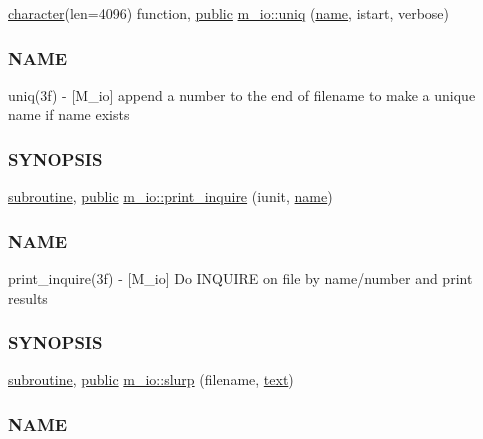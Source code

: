 \begin{DoxyCompactItemize}
\item 
\hyperlink{option__stopwatch_83_8txt_abd4b21fbbd175834027b5224bfe97e66}{character}(len=4096) function, \hyperlink{M__stopwatch_83_8txt_a2f74811300c361e53b430611a7d1769f}{public} \hyperlink{namespacem__io_a13a76a3cca012978c1d9c5c0c8b4a7ef}{m\+\_\+io\+::uniq} (\hyperlink{M__stopwatch_83_8txt_a3f508a893ae4c3b397b4383e33b9bcae}{name}, istart, verbose)
\begin{DoxyCompactList}\small\item\em \subsubsection*{N\+A\+ME}

uniq(3f) -\/ \mbox{[}M\+\_\+io\mbox{]} append a number to the end of filename to make a unique name if name exists \subsubsection*{S\+Y\+N\+O\+P\+S\+IS}\end{DoxyCompactList}\item 
\hyperlink{M__stopwatch_83_8txt_acfbcff50169d691ff02d4a123ed70482}{subroutine}, \hyperlink{M__stopwatch_83_8txt_a2f74811300c361e53b430611a7d1769f}{public} \hyperlink{namespacem__io_aa6ee277b2e0f1c263488624b34371fcf}{m\+\_\+io\+::print\+\_\+inquire} (iunit, \hyperlink{M__stopwatch_83_8txt_a3f508a893ae4c3b397b4383e33b9bcae}{name})
\begin{DoxyCompactList}\small\item\em \subsubsection*{N\+A\+ME}

print\+\_\+inquire(3f) -\/ \mbox{[}M\+\_\+io\mbox{]} Do I\+N\+Q\+U\+I\+RE on file by name/number and print results \subsubsection*{S\+Y\+N\+O\+P\+S\+IS}\end{DoxyCompactList}\item 
\hyperlink{M__stopwatch_83_8txt_acfbcff50169d691ff02d4a123ed70482}{subroutine}, \hyperlink{M__stopwatch_83_8txt_a2f74811300c361e53b430611a7d1769f}{public} \hyperlink{namespacem__io_ad25822cde8058cd6861e2d9a5d729ccc}{m\+\_\+io\+::slurp} (filename, \hyperlink{notes_8txt_ad997a48ee1fbabed5333859846b5d9a3}{text})
\begin{DoxyCompactList}\small\item\em \subsubsection*{N\+A\+ME}


\end{DoxyCompactList}
\end{DoxyCompactItemize}
